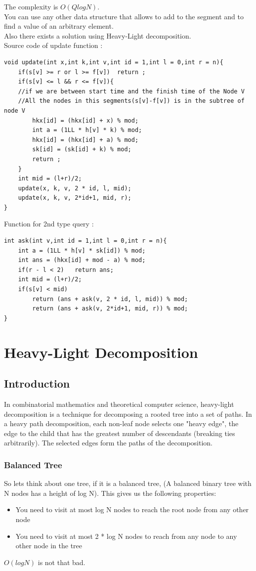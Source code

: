 \documentclass[12pt]{article}
\begin{document}
The complexity is $O(QlogN)$.\\
You can use any other data structure that allows to add to the segment and to find a value of an arbitrary element.\\
Also there exists a solution using Heavy-Light decomposition.\\
Source code of update function :
\begin{verbatim}
void update(int x,int k,int v,int id = 1,int l = 0,int r = n){
	if(s[v] >= r or l >= f[v])	return ;
	if(s[v] <= l && r <= f[v]){ 
	//if we are between start time and the finish time of the Node V
	//All the nodes in this segments(s[v]-f[v]) is in the subtree of node V   
		hkx[id] = (hkx[id] + x) % mod;
		int a = (1LL * h[v] * k) % mod;
		hkx[id] = (hkx[id] + a) % mod;
		sk[id] = (sk[id] + k) % mod;
		return ;
	}
	int mid = (l+r)/2;
	update(x, k, v, 2 * id, l, mid);
	update(x, k, v, 2*id+1, mid, r);
}
\end{verbatim}
Function for 2nd type query :
\begin{verbatim}
int ask(int v,int id = 1,int l = 0,int r = n){
	int a = (1LL * h[v] * sk[id]) % mod;
	int ans = (hkx[id] + mod - a) % mod;
	if(r - l < 2)	return ans;
	int mid = (l+r)/2;
	if(s[v] < mid)
		return (ans + ask(v, 2 * id, l, mid)) % mod;
		return (ans + ask(v, 2*id+1, mid, r)) % mod;
}
\end{verbatim}

\section{Heavy-Light Decomposition} \subsection{Introduction}
In combinatorial mathematics and theoretical computer science, heavy-light decomposition is a technique for decomposing a rooted tree into a set of paths. In a heavy path decomposition, each non-leaf node selects one "heavy edge", the edge to the child that has the greatest number of descendants (breaking ties arbitrarily). The selected edges form the paths of the decomposition.\cite{6} \\
\subsubsection*{Balanced Tree}
So lets think about one tree, if it is a balanced tree, (A balanced binary tree with N nodes has a height of log N). This gives us the following properties:\cite{7} \\
\begin{itemize}
    \item  You need to visit at most log N nodes to reach the root node from any other node
\item You need to visit at most 2 * log N nodes to reach from any node to any other node in the tree
\end{itemize}
$O(logN)$ is not that bad.
\end{document}
